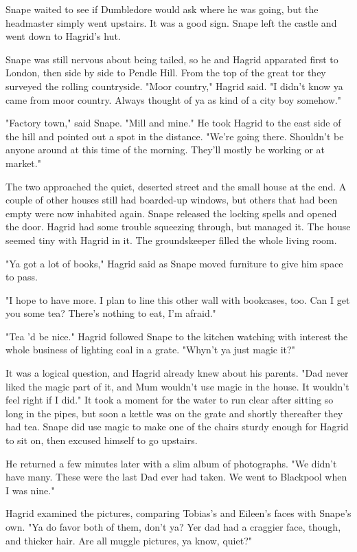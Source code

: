 \documentclass[a4paper,11pt]{article}
\begin{document}
Snape waited to see if Dumbledore would ask where he was going, but the headmaster simply went upstairs. It was a good sign. Snape left the castle and went down to Hagrid's hut.

Snape was still nervous about being tailed, so he and Hagrid apparated first to London, then side by side to Pendle Hill. From the top of the great tor they surveyed the rolling countryside. "Moor country," Hagrid said. "I didn't know ya came from moor country. Always thought of ya as kind of a city boy somehow."

"Factory town," said Snape. "Mill and mine." He took Hagrid to the east side of the hill and pointed out a spot in the distance. "We're going there. Shouldn't be anyone around at this time of the morning. They'll mostly be working or at market."

The two approached the quiet, deserted street and the small house at the end. A couple of other houses still had boarded-up windows, but others that had been empty were now inhabited again. Snape released the locking spells and opened the door. Hagrid had some trouble squeezing through, but managed it. The house seemed tiny with Hagrid in it. The groundskeeper filled the whole living room.

"Ya got a lot of books," Hagrid said as Snape moved furniture to give him space to pass.

"I hope to have more. I plan to line this other wall with bookcases, too. Can I get you some tea? There's nothing to eat, I'm afraid."

"Tea 'd be nice." Hagrid followed Snape to the kitchen watching with interest the whole business of lighting coal in a grate. "Whyn't ya just magic it?"

It was a logical question, and Hagrid already knew about his parents. "Dad never liked the magic part of it, and Mum wouldn't use magic in the house. It wouldn't feel right if I did." It took a moment for the water to run clear after sitting so long in the pipes, but soon a kettle was on the grate and shortly thereafter they had tea. Snape did use magic to make one of the chairs sturdy enough for Hagrid to sit on, then excused himself to go upstairs.

He returned a few minutes later with a slim album of photographs. "We didn't have many. These were the last Dad ever had taken. We went to Blackpool when I was nine."

Hagrid examined the pictures, comparing Tobias's and Eileen's faces with Snape's own. "Ya do favor both of them, don't ya? Yer dad had a craggier face, though, and thicker hair. Are all muggle pictures, ya know, quiet?"
\end{document}

